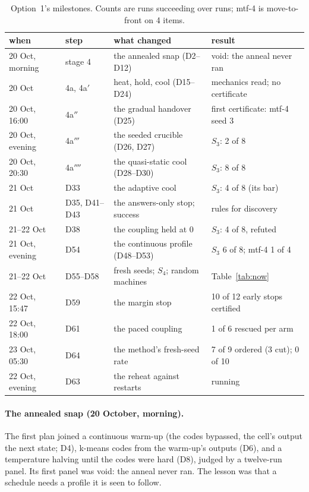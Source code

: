 \documentclass[11pt]{article}
\begin{document}
\begin{table}[t]
\centering
\small
\begin{tabular}{@{}llll@{}}
\toprule
when & step & what changed & result \\
\midrule
20 Oct, morning & stage 4 & the annealed snap (D2--D12) & void: the anneal never ran \\
20 Oct & 4a, 4a$'$ & heat, hold, cool (D15--D24) & mechanics read; no certificate \\
20 Oct, 16:00 & 4a$''$ & the gradual handover (D25) & first certificate: mtf-4 seed 3 \\
20 Oct, evening & 4a$'''$ & the seeded crucible (D26, D27) & $S_3$: 2 of 8 \\
20 Oct, 20:30 & 4a$''''$ & the quasi-static cool (D28--D30) & $S_3$: 8 of 8 \\
21 Oct & D33 & the adaptive cool & $S_3$: 4 of 8 (its bar) \\
21 Oct & D35, D41--D43 & the answers-only stop; success & rules for discovery \\
21--22 Oct & D38 & the coupling held at 0 & $S_3$: 4 of 8, refuted \\
21 Oct, evening & D54 & the continuous profile (D48--D53) & $S_3$ 6 of 8; mtf-4 1 of 4 \\
21--22 Oct & D55--D58 & fresh seeds; $S_4$; random machines & Table~\ref{tab:now} \\
22 Oct, 15:47 & D59 & the margin stop & 10 of 12 early stops certified \\
22 Oct, 18:00 & D61 & the paced coupling & 1 of 6 rescued per arm \\
23 Oct, 05:30 & D64 & the method's fresh-seed rate & 7 of 9 ordered (3 cut); 0 of 10 \\
22 Oct, evening & D63 & the reheat against restarts & running \\
\bottomrule
\end{tabular}
\caption{Option~1's milestones. Counts are runs succeeding over runs; mtf-4 is move-to-front on 4
items.}
\label{tab:milestones}
\end{table}

\paragraph{The annealed snap (20 October, morning).} The first plan joined a continuous warm-up (the
codes bypassed, the cell's output the next state; D4), k-means codes from the warm-up's outputs (D6),
and a temperature halving until the codes were hard (D8), judged by a twelve-run panel. Its first
panel was void: the anneal never ran. The lesson was that a schedule needs a profile it is seen to
follow.
\end{document}
